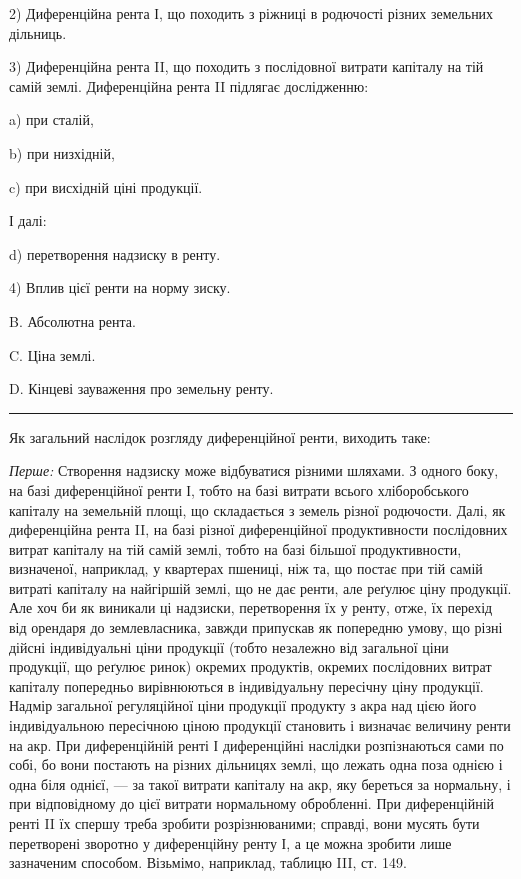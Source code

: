 \parcont{}  %
2) Диференційна рента І, що походить з ріжниці в родючості різних земельних
дільниць.

3) Диференційна рента II, що походить з послідовної витрати капіталу
на тій самій землі. Диференційна рента II підлягає дослідженню:

a) при сталій,

b) при низхідній,

c) при висхідній ціні продукції.

І далі:

d) перетворення надзиску в ренту.

4) Вплив цієї ренти на норму зиску.

B. Абсолютна рента.

C. Ціна землі.

D. Кінцеві зауваження про земельну ренту.

\pfbreak

Як загальний наслідок розгляду диференційної ренти, виходить таке:

\emph{Перше:} Створення надзиску може відбуватися різними шляхами. З одного
боку, на базі диференційної ренти І, тобто на базі витрати всього
хліборобського капіталу на земельній площі, що складається з земель різної
родючости. Далі, як диференційна рента II, на базі різної диференційної продуктивности
послідовних витрат капіталу на тій самій землі, тобто на базі
більшої продуктивности, визначеної, наприклад, у квартерах пшениці, ніж та,
що постає при тій самій витраті капіталу на найгіршій землі, що не дає ренти,
але реґулює ціну продукції. Але хоч би як виникали ці надзиски, перетворення
їх у ренту, отже, їх перехід від орендаря до землевласника, завжди припускав
як попередню умову, що різні дійсні індивідуальні ціни продукції (тобто незалежно
від загальної ціни продукції, що реґулює ринок) окремих продуктів, окремих
послідовних витрат капіталу попередньо вирівнюються в індивідуальну
пересічну ціну продукції. Надмір загальної регуляційної ціни продукції продукту
з акра над цією його індивідуальною пересічною ціною продукції становить
і визначає величину ренти на акр. При диференційній ренті І диференційні
наслідки розпізнаються сами по собі, бо вони постають на різних дільницях
землі, що лежать одна поза однією і одна біля однієї, — за такої витрати капіталу
на акр, яку береться за нормальну, і при відповідному до цієї витрати
нормальному обробленні. При диференційній ренті II їх спершу треба зробити
розрізнюваними; справді, вони мусять бути перетворені зворотно у диференційну
ренту І, а це можна зробити лише зазначеним способом. Візьмімо, наприклад,
таблицю III, ст. 149.

